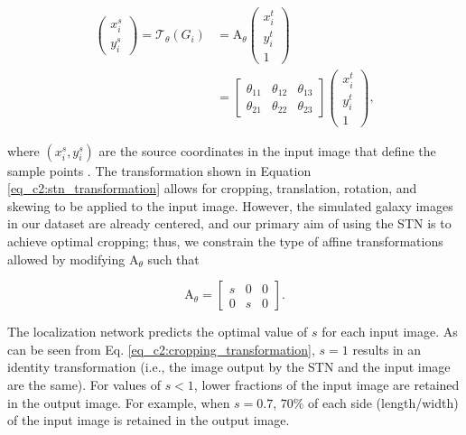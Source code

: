 \begin{equation}
\begin{split}
\left(\begin{array}{c}
x_{i}^{s} \\
y_{i}^{s}
\end{array}\right)=\mathcal{T}_{\theta}\left(G_{i}\right) & = \mathrm{A}_{\theta}\left(\begin{array}{c}
x_{i}^{t} \\
y_{i}^{t} \\
1
\end{array}\right) \\
& = \left[\begin{array}{lll}
\theta_{11} & \theta_{12} & \theta_{13} \\
\theta_{21} & \theta_{22} & \theta_{23}
\end{array}\right]\left(\begin{array}{c}
x_{i}^{t} \\
y_{i}^{t} \\
1
\end{array}\right) ,
\end{split}
\label{eq_c2:stn_transformation}
\end{equation}

\noindent
where $ \left(x_i^s,y_i^s\right)$ are the source coordinates in the input image that define the sample points \citep{jarderberg_15}. The transformation shown in Equation\,\ref{eq_c2:stn_transformation} allows for cropping, translation, rotation, and skewing to be applied to the input image. However, the simulated galaxy images in our dataset are already centered, and our primary aim of using the STN is to achieve optimal cropping; thus, we constrain the type of affine transformations allowed by modifying $\mathrm{A}_{\theta}$ such that 

\begin{equation}
\mathrm{A}_{\theta} = \left[\begin{array}{lll}
s & 0 & 0 \\
0 & s & 0
\end{array}\right] .
\label{eq_c2:cropping_transformation}
\end{equation}

\noindent
The localization network predicts the optimal value of $s$ for each input image. As can be seen from Eq. \ref{eq_c2:cropping_transformation}, $s=1$ results in an identity transformation (i.e., the image output by the STN and the input image are the same). For values of $s < 1$, lower fractions of the input image are retained in the output image. For example, when $s=0.7$, $70\%$ of each side (length/width) of the input image is retained in the output image.

